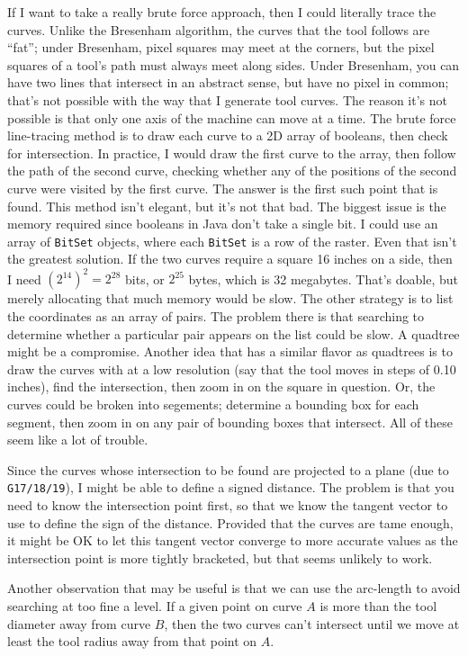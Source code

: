 \documentclass[titlepage,oneside,10pt]{article}
\begin{document}
If I want to take a really brute force approach, then I could
literally trace the curves. Unlike the Bresenham algorithm, the curves
that the tool follows are ``fat''; under Bresenham, pixel squares may
meet at the corners, but the pixel squares of a tool's path must
always meet along sides. Under Bresenham, you can have two lines that
intersect in an abstract sense, but have no pixel in common; that's
not possible with the way that I generate tool curves. The reason it's
not possible is that only one axis of the machine can move at a
time. The brute force line-tracing method is to draw each curve to a
2D array of booleans, then check for intersection. In practice, I
would draw the first curve to the array, then follow the path of the
second curve, checking whether any of the positions of the second
curve were visited by the first curve. The answer is the first such
point that is found. This method isn't elegant, but it's not that
bad. The biggest issue is the memory required since booleans in Java
don't take a single bit. I could use an array of {\tt BitSet} objects,
where each {\tt BitSet} is a row of the raster. Even that isn't the
greatest solution. If the two curves require a square 16 inches on a
side, then I need $(2^{14})^2 = 2^{28}$ bits, or $2^{25}$ bytes, which
is 32 megabytes. That's doable, but merely allocating that much memory
would be slow. The other strategy is to list the coordinates as an
array of pairs. The problem there is that searching to determine
whether a particular pair appears on the list could be slow. A
quadtree might be a compromise. Another idea that has a similar flavor
as quadtrees is to draw the curves with at a low resolution (say that
the tool moves in steps of 0.10 inches), find the intersection, then
zoom in on the square in question. Or, the curves could be broken into
segements; determine a bounding box for each segment, then zoom in on
any pair of bounding boxes that intersect. All of these seem like a
lot of trouble.

Since the curves whose intersection to be found are projected to a
plane (due to {\tt G17/18/19}), I might be able to define a signed
distance. The problem is that you need to know the intersection point
first, so that we know the tangent vector to use to define the sign of
the distance. Provided that the curves are tame enough, it might be OK
to let this tangent vector converge to more accurate values as the
intersection point is more tightly bracketed, but that seems unlikely
to work.

Another observation that may be useful is that we can use the
arc-length to avoid searching at too fine a level. If a given point on
curve $A$ is more than the tool diameter away from curve $B$, then the
two curves can't intersect until we move at least the tool radius away
from that point on $A$.
\end{document}

